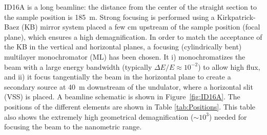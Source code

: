 \documentclass{iucr}              %
\newcommand{\inred}[1]{{\color{black}#1}}
\begin{document}
\begin{table}\label{tab:Undulators}
\centering
\caption{Parameters of the undulators available at the ID16A beamline: period ($\lambda_u$), length ($L$), number of identical undulators ($N$) and deflection parameter ($K$) values for \inred{two main photon energies}. The valuse are shown for the two ESRF magnetic lattices: the old ESRF-1, with $E_e = 6.04$~GeV), and the new EBS, with $E_e = 6.00$~GeV. $n$ is the emission harmonic in use for each particular photon energy.}

\end{table}

ID16A is a long beamline: the distance from the center of the straight section to the sample position is 185~m. Strong focusing is performed using a Kirkpatrick-Baez (KB) mirror system placed a few cm upstream of the sample position (focal plane), which ensures a high demagnification. In order to match the acceptance of the KB in the vertical and horizontal planes, a focusing (cylindrically bent) multilayer monochromator (ML) has
been chosen. It i) monochromatizes the beam with a large energy bandwidth (typically $\Delta E/E \approx 10^{-2}$) to allow high flux, 
and ii) it focus tangentially the beam in the horizontal plane to create a secondary source at 40~m downstream of the undulator, where a horizontal slit (VSS) is placed. A beamline schematic is shown in Figure~\ref{fig:ID16A}. The positions of the different elements are shown in Table \ref{tab:Positions}. This table also shows the extremely high geometrical demagnification ($\sim 10^3$) needed for focusing the beam to the nanometric range.  
\end{document}
